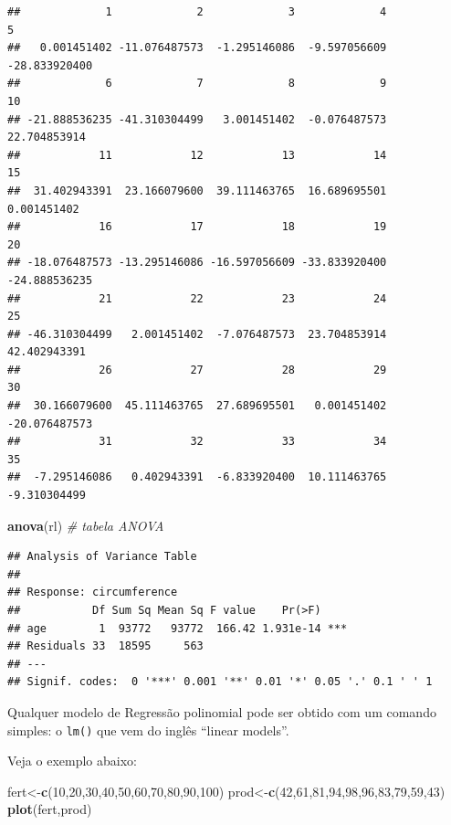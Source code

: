 \documentclass[
]{book}
\newenvironment{Shaded}{\begin{snugshade}}{\end{snugshade}}
\newcommand{\CommentTok}[1]{\textcolor[rgb]{0.56,0.35,0.01}{\textit{#1}}}
\newcommand{\DecValTok}[1]{\textcolor[rgb]{0.00,0.00,0.81}{#1}}
\newcommand{\KeywordTok}[1]{\textcolor[rgb]{0.13,0.29,0.53}{\textbf{#1}}}
\newcommand{\NormalTok}[1]{#1}
\begin{document}
\begin{verbatim}
##             1             2             3             4             5 
##   0.001451402 -11.076487573  -1.295146086  -9.597056609 -28.833920400 
##             6             7             8             9            10 
## -21.888536235 -41.310304499   3.001451402  -0.076487573  22.704853914 
##            11            12            13            14            15 
##  31.402943391  23.166079600  39.111463765  16.689695501   0.001451402 
##            16            17            18            19            20 
## -18.076487573 -13.295146086 -16.597056609 -33.833920400 -24.888536235 
##            21            22            23            24            25 
## -46.310304499   2.001451402  -7.076487573  23.704853914  42.402943391 
##            26            27            28            29            30 
##  30.166079600  45.111463765  27.689695501   0.001451402 -20.076487573 
##            31            32            33            34            35 
##  -7.295146086   0.402943391  -6.833920400  10.111463765  -9.310304499
\end{verbatim}

\begin{Shaded}
\begin{Highlighting}[]
\KeywordTok{anova}\NormalTok{(rl) }\CommentTok{# tabela ANOVA}
\end{Highlighting}
\end{Shaded}

\begin{verbatim}
## Analysis of Variance Table
## 
## Response: circumference
##           Df Sum Sq Mean Sq F value    Pr(>F)    
## age        1  93772   93772  166.42 1.931e-14 ***
## Residuals 33  18595     563                      
## ---
## Signif. codes:  0 '***' 0.001 '**' 0.01 '*' 0.05 '.' 0.1 ' ' 1
\end{verbatim}

Qualquer modelo de Regressão polinomial pode ser obtido com um comando
simples: o \texttt{lm()} que vem do inglês ``linear models''.

Veja o exemplo abaixo:

\begin{Shaded}
\begin{Highlighting}[]
\NormalTok{fert<-}\KeywordTok{c}\NormalTok{(}\DecValTok{10}\NormalTok{,}\DecValTok{20}\NormalTok{,}\DecValTok{30}\NormalTok{,}\DecValTok{40}\NormalTok{,}\DecValTok{50}\NormalTok{,}\DecValTok{60}\NormalTok{,}\DecValTok{70}\NormalTok{,}\DecValTok{80}\NormalTok{,}\DecValTok{90}\NormalTok{,}\DecValTok{100}\NormalTok{)}
\NormalTok{prod<-}\KeywordTok{c}\NormalTok{(}\DecValTok{42}\NormalTok{,}\DecValTok{61}\NormalTok{,}\DecValTok{81}\NormalTok{,}\DecValTok{94}\NormalTok{,}\DecValTok{98}\NormalTok{,}\DecValTok{96}\NormalTok{,}\DecValTok{83}\NormalTok{,}\DecValTok{79}\NormalTok{,}\DecValTok{59}\NormalTok{,}\DecValTok{43}\NormalTok{)}
\KeywordTok{plot}\NormalTok{(fert,prod)}
\end{Highlighting}
\end{Shaded}
\end{document}
